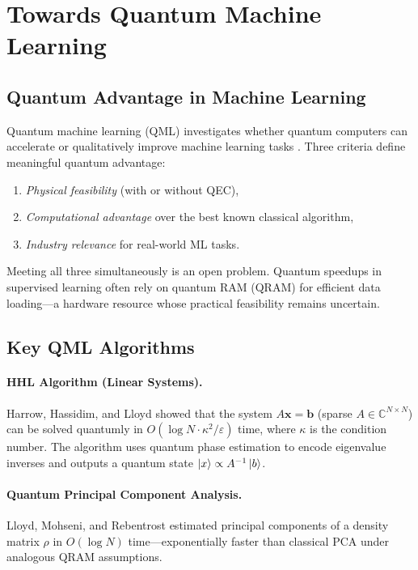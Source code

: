 \documentclass[aps, reprint, twocolumn, superscriptaddress, floatfix]{revtex4-2}
\begin{document}
\section{Towards Quantum Machine Learning}
\label{sec:qml}

\subsection{Quantum Advantage in Machine Learning}
\label{ssec:qml-advantage}

Quantum machine learning (QML) investigates whether quantum computers can
accelerate or qualitatively improve machine learning tasks
\cite{biamonte2017quantum}.  Three criteria define meaningful quantum advantage:
\begin{enumerate}
  \item \textit{Physical feasibility} (with or without QEC),
  \item \textit{Computational advantage} over the best known classical algorithm,
  \item \textit{Industry relevance} for real-world ML tasks.
\end{enumerate}
Meeting all three simultaneously is an open problem.  Quantum speedups in
supervised learning often rely on quantum RAM (QRAM) for efficient data
loading---a hardware resource whose practical feasibility remains uncertain.

\subsection{Key QML Algorithms}
\label{ssec:qml-algorithms}

\paragraph{HHL Algorithm (Linear Systems).}
Harrow, Hassidim, and Lloyd \cite{harrow2009quantum} showed that the system
$A\mathbf{x} = \mathbf{b}$ (sparse $A\in\mathbb{C}^{N\times N}$) can be solved
quantumly in $O(\log N\cdot\kappa^2/\varepsilon)$ time, where $\kappa$ is the
condition number.  The algorithm uses quantum phase estimation to encode
eigenvalue inverses and outputs a quantum state $\ket{x}\propto A^{-1}\ket{b}$.

\paragraph{Quantum Principal Component Analysis.}
Lloyd, Mohseni, and Rebentrost \cite{lloyd2014quantum} estimated principal
components of a density matrix $\rho$ in $O(\log N)$ time---exponentially faster
than classical PCA under analogous QRAM assumptions.
\end{document}

